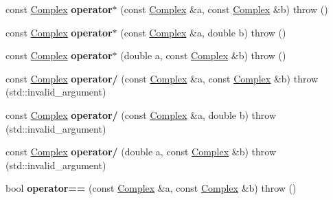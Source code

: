 \begin{DoxyCompactItemize}
const \hyperlink{classkerbal_1_1math_1_1_complex}{Complex} {\bfseries operator$\ast$} (const \hyperlink{classkerbal_1_1math_1_1_complex}{Complex} \&a, const \hyperlink{classkerbal_1_1math_1_1_complex}{Complex} \&b)  throw ()
\item 
\mbox{\label{namespacekerbal_1_1math_abdf2cd6febbc69d0e9c1b30ed0f01e93}} 
const \hyperlink{classkerbal_1_1math_1_1_complex}{Complex} {\bfseries operator$\ast$} (const \hyperlink{classkerbal_1_1math_1_1_complex}{Complex} \&a, double b)  throw ()
\item 
\mbox{\label{namespacekerbal_1_1math_ad5e3441cff69dddc446d0c9755e42c97}} 
const \hyperlink{classkerbal_1_1math_1_1_complex}{Complex} {\bfseries operator$\ast$} (double a, const \hyperlink{classkerbal_1_1math_1_1_complex}{Complex} \&b)  throw ()
\item 
\mbox{\label{namespacekerbal_1_1math_a6bda4b67435d2150834d6adca0ac6196}} 
const \hyperlink{classkerbal_1_1math_1_1_complex}{Complex} {\bfseries operator/} (const \hyperlink{classkerbal_1_1math_1_1_complex}{Complex} \&a, const \hyperlink{classkerbal_1_1math_1_1_complex}{Complex} \&b)  throw (std\+::invalid\+\_\+argument)
\item 
\mbox{\label{namespacekerbal_1_1math_ab7b5ff95d28c22c7e851075b9c6ba0b6}} 
const \hyperlink{classkerbal_1_1math_1_1_complex}{Complex} {\bfseries operator/} (const \hyperlink{classkerbal_1_1math_1_1_complex}{Complex} \&a, double b)  throw (std\+::invalid\+\_\+argument)
\item 
\mbox{\label{namespacekerbal_1_1math_a251cf852afdc36e806db0eae7365bf6f}} 
const \hyperlink{classkerbal_1_1math_1_1_complex}{Complex} {\bfseries operator/} (double a, const \hyperlink{classkerbal_1_1math_1_1_complex}{Complex} \&b)  throw (std\+::invalid\+\_\+argument)
\item 
\mbox{\label{namespacekerbal_1_1math_a5543d0bcdf5ae9911656299291c9afa9}} 
bool {\bfseries operator==} (const \hyperlink{classkerbal_1_1math_1_1_complex}{Complex} \&a, const \hyperlink{classkerbal_1_1math_1_1_complex}{Complex} \&b)  throw ()
\item 
\mbox{\label{namespacekerbal_1_1math_a45476d74750f3362320b0497c22439c1}} 

\end{DoxyCompactItemize}

